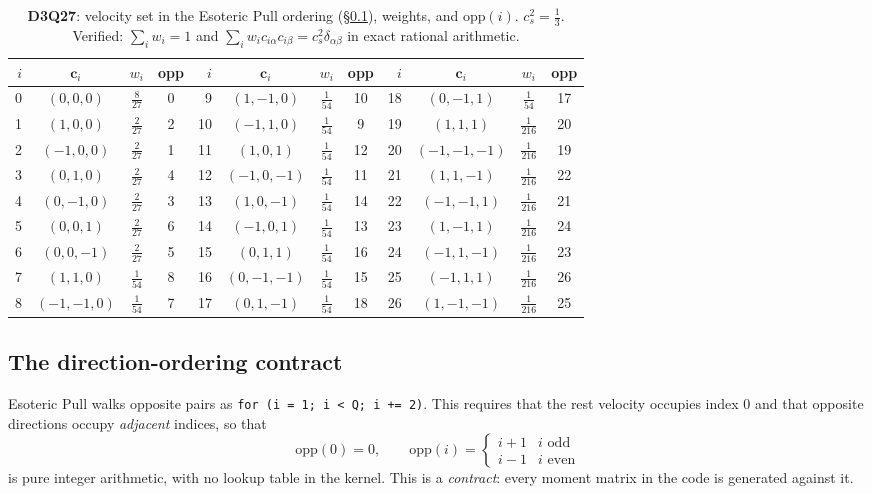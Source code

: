 \documentclass[11pt,a4paper]{article}
\newcommand{\code}[1]{\texttt{\small #1}}
\newcommand{\cs}{c_s}
\newcommand{\ci}{\bm{c}_i}
\begin{document}
\begin{table}[t]
\centering\small
\begin{tabular}{r c c c r c c c r c c c }
\toprule
$i$ & $\ci$ & $w_i$ & opp & $i$ & $\ci$ & $w_i$ & opp & $i$ & $\ci$ & $w_i$ & opp \\
\midrule
0 & $(0,0,0)$ & $\tfrac{8}{27}$ & 0 & 9 & $(1,-1,0)$ & $\tfrac{1}{54}$ & 10 & 18 & $(0,-1,1)$ & $\tfrac{1}{54}$ & 17 \\
1 & $(1,0,0)$ & $\tfrac{2}{27}$ & 2 & 10 & $(-1,1,0)$ & $\tfrac{1}{54}$ & 9 & 19 & $(1,1,1)$ & $\tfrac{1}{216}$ & 20 \\
2 & $(-1,0,0)$ & $\tfrac{2}{27}$ & 1 & 11 & $(1,0,1)$ & $\tfrac{1}{54}$ & 12 & 20 & $(-1,-1,-1)$ & $\tfrac{1}{216}$ & 19 \\
3 & $(0,1,0)$ & $\tfrac{2}{27}$ & 4 & 12 & $(-1,0,-1)$ & $\tfrac{1}{54}$ & 11 & 21 & $(1,1,-1)$ & $\tfrac{1}{216}$ & 22 \\
4 & $(0,-1,0)$ & $\tfrac{2}{27}$ & 3 & 13 & $(1,0,-1)$ & $\tfrac{1}{54}$ & 14 & 22 & $(-1,-1,1)$ & $\tfrac{1}{216}$ & 21 \\
5 & $(0,0,1)$ & $\tfrac{2}{27}$ & 6 & 14 & $(-1,0,1)$ & $\tfrac{1}{54}$ & 13 & 23 & $(1,-1,1)$ & $\tfrac{1}{216}$ & 24 \\
6 & $(0,0,-1)$ & $\tfrac{2}{27}$ & 5 & 15 & $(0,1,1)$ & $\tfrac{1}{54}$ & 16 & 24 & $(-1,1,-1)$ & $\tfrac{1}{216}$ & 23 \\
7 & $(1,1,0)$ & $\tfrac{1}{54}$ & 8 & 16 & $(0,-1,-1)$ & $\tfrac{1}{54}$ & 15 & 25 & $(-1,1,1)$ & $\tfrac{1}{216}$ & 26 \\
8 & $(-1,-1,0)$ & $\tfrac{1}{54}$ & 7 & 17 & $(0,1,-1)$ & $\tfrac{1}{54}$ & 18 & 26 & $(1,-1,-1)$ & $\tfrac{1}{216}$ & 25 \\
\bottomrule
\end{tabular}
\caption{\textbf{D3Q27}: velocity set in the Esoteric Pull ordering
(\S\ref{sec:ordering}), weights, and $\mathrm{opp}(i)$. $\cs^2=\tfrac{1}{3}$.
Verified: $\sum_i w_i=1$ and $\sum_i w_i c_{i\alpha}c_{i\beta}=\cs^2\delta_{\alpha\beta}$
in exact rational arithmetic.}
\end{table}

\subsection{The direction-ordering contract}
\label{sec:ordering}

Esoteric Pull walks opposite pairs as \code{for (i = 1; i < Q; i += 2)}. This
requires that the rest velocity occupies index $0$ and that opposite directions
occupy \emph{adjacent} indices, so that
\begin{equation}
  \mathrm{opp}(0)=0, \qquad
  \mathrm{opp}(i) = \begin{cases} i+1 & i \text{ odd} \\ i-1 & i \text{ even}\end{cases}
  \label{eq:opp}
\end{equation}
is pure integer arithmetic, with no lookup table in the kernel. This is a
\emph{contract}: every moment matrix in the code is generated against it.
\end{document}
